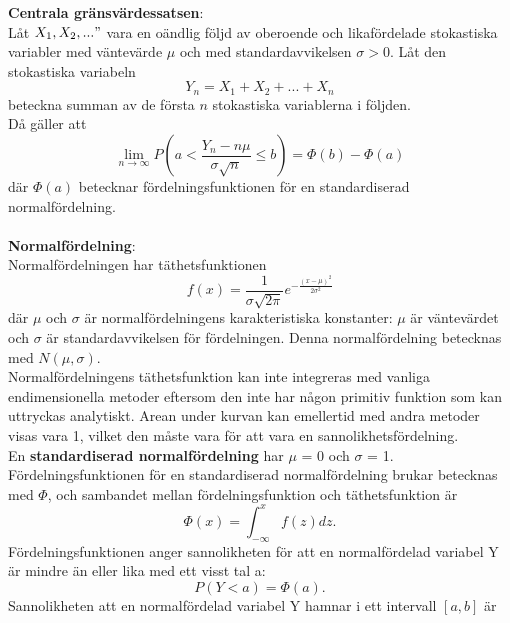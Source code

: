 \documentclass[8pt]{extarticle}
\begin{document}
\begin{multicols*}{2}
\textbf{Centrala gränsvärdessatsen}:\\
Låt $X_1,X_2,..."$ vara en oändlig följd av oberoende och likafördelade stokastiska variabler med väntevärde $\mu$ och med standardavvikelsen $\sigma > 0$. Låt den stokastiska variabeln
\begin{equation*}
Y_n = X_1 + X_2 + ... + X_n
\end{equation*}
beteckna summan av de första $n$ stokastiska variablerna i följden.\\
Då gäller att
\begin{equation*}
\lim_{n \rightarrow \infty} P\left( a < \frac{Y_n - n\mu}{\sigma \sqrt{n}} \leq b \right) = \Phi (b) - \Phi (a)
\end{equation*}
där $\Phi (a)$ betecknar fördelningsfunktionen för en standardiserad normalfördelning.\\
\\
\textbf{Normalfördelning}:\\
Normalfördelningen har täthetsfunktionen
\begin{equation*}
f(x) = \frac{1}{\sigma\sqrt{2 \pi}} e^{-\frac{(x - \mu)^2}{2 \sigma^2}}
\end{equation*}
där $\mu$ och $\sigma$ är normalfördelningens karakteristiska konstanter: $\mu$ är väntevärdet och $\sigma$ är standardavvikelsen för fördelningen. Denna normalfördelning betecknas med $N(\mu,\sigma)$.\\
Normalfördelningens täthetsfunktion kan inte integreras med vanliga endimensionella metoder eftersom den inte har någon primitiv funktion som kan uttryckas analytiskt. Arean under kurvan kan emellertid med andra metoder visas vara 1, vilket den måste vara för att vara en sannolikhetsfördelning.\\
En \textbf{standardiserad normalfördelning} har $\mu$ = 0 och $\sigma$ = 1.\\
Fördelningsfunktionen för en standardiserad normalfördelning brukar betecknas med $\Phi$, och sambandet mellan fördelningsfunktion och täthetsfunktion är
\begin{equation*}
\Phi (x) = \int_{-\infty}^x f(z)dz.
\end{equation*}
Fördelningsfunktionen anger sannolikheten för att en normalfördelad variabel Y är mindre än eller lika med ett visst tal a:
\begin{equation*}
P(Y < a) = \Phi	(a).
\end{equation*}
Sannolikheten att en normalfördelad variabel Y hamnar i ett intervall $[a,b]$ är
\begin{equation*}

\end{equation*}
\end{multicols*}
\end{document}
